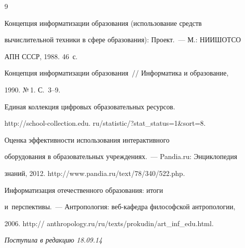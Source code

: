 {\small\frenchspacing


{%




\begin{thebibliography}{9}




Концепция информатизации образования (использование средств


вычислительной техники в сфере образования): Проект.~--- М.: НИИШОТСО


АПН СССР, 1988. 46~с.




 Концепция информатизации образования~/\!\!/ Информатика и образование,


1990. №\,1. С.~3--9.




Единая коллекция цифровых образовательных ресурсов.


{\sf http://school-collection.edu. ru/statistic/?stat\_status=1\&sort=8}.




 Оценка эффективности использования интерактивного


оборудования в образовательных учреждениях.~--- Pandia.ru: Энциклопедия


знаний, 2012. {\sf http://www.pandia.ru/text/78/340/522.php}.




 Информатизация отечественного образования: итоги


и~перспективы.~--- Антропология: веб-ка\-фед\-ра философской антропологии,


2006. {\sf http:// anthropology.ru/ru/texts/prokudin/art\_inf\_edu.html}.


\end{thebibliography}


} }








\vspace*{-6pt}





\hfill{\small\textit{Поступила в редакцию 18.09.14}}













